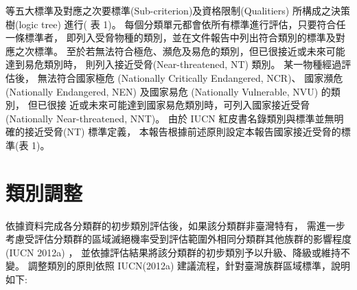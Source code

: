 \begin{multicols}{2}
等五大標準及對應之次要標準(Sub-criterion)及資格限制(Qualitiers)
所構成之決策樹(logic tree) 進行( 表 1)。
每個分類單元都會依所有標準進行評估，只要符合任一條標準者，
即列入受脅物種的類別，並在文件報告中列出符合類別的標準及對應之次標準。
至於若無法符合極危、瀕危及易危的類別，但已很接近或未來可能達到易危類別時，
則列入接近受脅(Near-threatened, NT) 類別。 某一物種經過評估後，
無法符合國家極危 (Nationally Critically Endangered, NCR)、
國家瀕危(Nationally Endangered, NEN) 及國家易危 (Nationally Vulnerable, NVU) 的類別，
但已很接 近或未來可能達到國家易危類別時，可列入國家接近受脅(Nationally Near-threatened, NNT)。
由於 IUCN 紅皮書名錄類別與標準並無明確的接近受脅(NT) 標準定義，
本報告根據前述原則設定本報告國家接近受脅的標準(表 1)。\\
\end{multicols}



\section{類別調整}
\begin{multicols}{2}
依據資料完成各分類群的初步類別評估後，如果該分類群非臺灣特有，
需進一步考慮受評估分類群的區域滅絕機率受到評估範圍外相同分類群其他族群的影響程度
(IUCN 2012a) ，
並依據評估結果將該分類群的初步類別予以升級、降級或維持不變。
調整類別的原則依照 IUCN(2012a) 建議流程，針對臺灣族群區域標準，說明如下:


\end{multicols}


